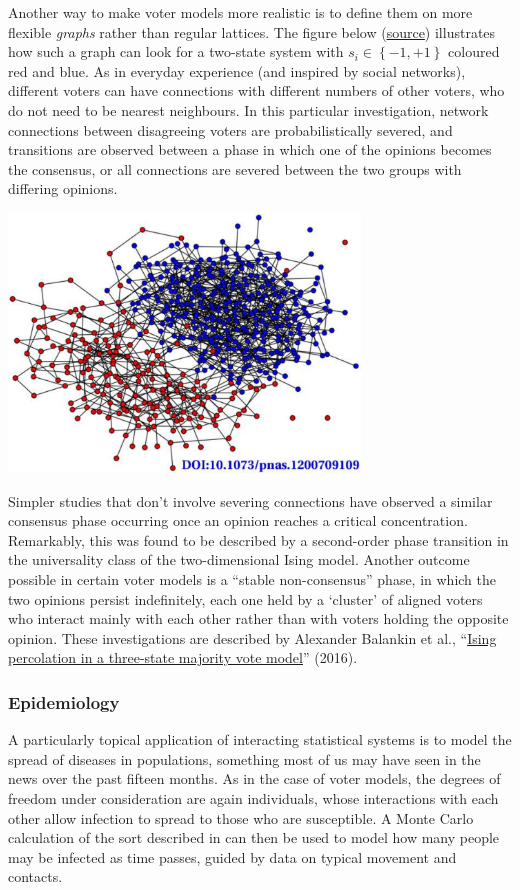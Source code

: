 Another way to make voter models more realistic is to define them on more flexible \textit{graphs} rather than regular lattices.
The figure below (\href{https://doi.org/10.1073/pnas.1200709109}{source}) illustrates how such a graph can look for a two-state system with $s_i \in \left\{-1, +1\right\}$ coloured red and blue.
As in everyday experience (and inspired by social networks), different voters can have connections with different numbers of other voters, who do not need to be nearest neighbours.
In this particular investigation, network connections between disagreeing voters are probabilistically severed, and transitions are observed between a phase in which one of the opinions becomes the consensus, or all connections are severed between the two groups with differing opinions.

\begin{center}\includegraphics[width=0.7\textwidth]{figs/week11_voter.pdf}\end{center}

Simpler studies that don't involve severing connections have observed a similar consensus phase occurring once an opinion reaches a critical concentration.
Remarkably, this was found to be described by a second-order phase transition in the universality class of the two-dimensional Ising model.
Another outcome possible in certain voter models is a ``stable non-consensus'' phase, in which the two opinions persist indefinitely, each one held by a `cluster' of aligned voters who interact mainly with each other rather than with voters holding the opposite opinion.
These investigations are described by Alexander Balankin et al., ``\href{https://doi.org/10.1016/j.physleta.2016.12.001}{Ising percolation in a three-state majority vote model}'' (2016).

\subsubsection*{Epidemiology}
A particularly topical application of interacting statistical systems is to model the spread of diseases in populations, something most of us may have seen in the news over the past fifteen months.
As in the case of voter models, the degrees of freedom under consideration are again individuals, whose interactions with each other allow infection to spread to those who are susceptible.
A Monte Carlo calculation of the sort described in  can then be used to model how many people may be infected as time passes, guided by data on typical movement and contacts.

